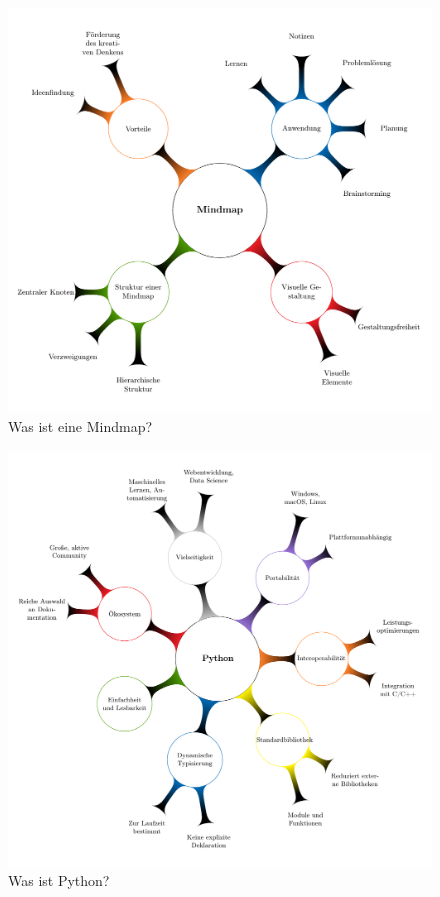 \documentclass{vorlage-design-main}
\begin{document}
\begin{figure}
\centering
\includegraphics[width=0.6\linewidth,keepaspectratio]{images/Mindmap.pdf}
\caption{Was ist eine Mindmap?}
\end{figure}

\begin{figure}
\centering
\includegraphics[width=0.6\linewidth,keepaspectratio]{images/Mindmap-Python.pdf}
\caption{Was ist Python?}
\end{figure}


\clearpage
\printbibliography
\end{document}
